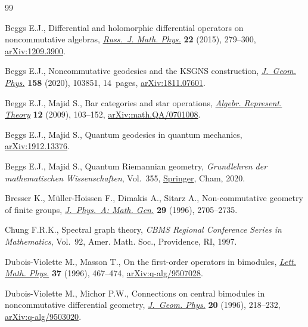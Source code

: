 \begin{thebibliography}{99}
\footnotesize\itemsep=0pt

Beggs E.J., Differential and holomorphic differential operators on
 noncommutative algebras, \href{https://doi.org/10.1134/S1061920815030012}{\textit{Russ.~J. Math. Phys.}} \textbf{22} (2015),
 279--300, \href{https://arxiv.org/abs/1209.3900}{arXiv:1209.3900}.

Beggs E.J., Noncommutative geodesics and the {KSGNS} construction,
 \href{https://doi.org/10.1016/j.geomphys.2020.103851}{\textit{J.~Geom. Phys.}} \textbf{158} (2020), 103851, 14~pages, \href{https://arxiv.org/abs/1811.07601}{arXiv:1811.07601}.

Beggs E.J., Majid S., Bar categories and star operations, \href{https://doi.org/10.1007/s10468-009-9141-x}{\textit{Algebr.
 Represent. Theory}} \textbf{12} (2009), 103--152, \href{https://arxiv.org/abs/math.QA/0701008}{arXiv:math.QA/0701008}.

Beggs E.J., Majid S., Quantum geodesics in quantum mechanics,
 \href{https://arxiv.org/abs/1912.13376}{arXiv:1912.13376}.

Beggs E.J., Majid S., Quantum {R}iemannian geometry, \textit{Grundlehren der
 mathematischen Wissenschaften}, Vol.~355, \href{https://doi.org/10.1007/978-3-030-30294-8}{Springer}, Cham, 2020.

Bresser K., M\"uller-Hoissen F., Dimakis A., Sitarz A., Non-commutative
 geometry of finite groups, \href{https://doi.org/10.1088/0305-4470/29/11/010}{\textit{J.~Phys.~A: Math. Gen.}} \textbf{29}
 (1996), 2705--2735.

Chung F.R.K., Spectral graph theory, \textit{CBMS Regional Conference Series in
 Mathematics}, Vol.~92, Amer. Math. Soc., Providence, RI, 1997.

Dubois-Violette M., Masson T., On the first-order operators in bimodules,
 \href{https://doi.org/10.1007/BF00312677}{\textit{Lett. Math. Phys.}} \textbf{37} (1996), 467--474,
 \href{https://arxiv.org/abs/q-alg/9507028}{arXiv:q-alg/9507028}.

Dubois-Violette M., Michor P.W., Connections on central bimodules in
 noncommutative differential geometry, \href{https://doi.org/10.1016/0393-0440(95)00057-7}{\textit{J.~Geom. Phys.}} \textbf{20}
 (1996), 218--232, \href{https://arxiv.org/abs/q-alg/9503020}{arXiv:q-alg/9503020}.


\end{thebibliography}
